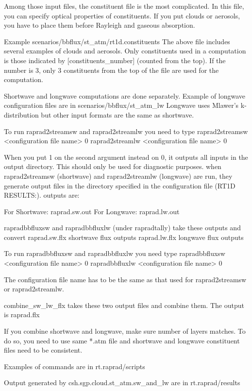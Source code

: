 Among those input files, the constituent file is the most complicated.
In this file, you can specify optical properties of constituents.
If you put clouds or aerosols, you have to place them before Rayleigh and gaseous absorption.

Example
scenarios/bbflux/st_atm/rt1d.constituents
The above file includes several examples of clouds and aerosols. Only constituents used in a computation is those
indicated by [constituents_number] (counted from the top). If the number is 3, only 3 constituents from the top
of the file are used for the computation.

Shortwave and longwave computations are done separately.
Example of longwave configuration files are in scenarios/bbflux/st_atm_lw
Longwave uses Mlawer's k-distribution but other input formats are the same as shortwave.

To run raprad2streamsw and raprad2streamlw you need to type
raprad2streamsw <configuration file name> 0
raprad2streamlw <configuration file name> 0

When you put 1 on the second argument instead on 0, it outputs all inputs in the output directory. This should only be used for diagnostic purposes.
when raprad2streamsw (shortwave) and raprad2streamlw (longwave) are run, they generate output files in the
directory specified in the configuration file (RT1D RESULTS:).
outputs are:

For Shortwave:	raprad.sw.out 
For Longwave:	raprad.lw.out

rapradbbfluxsw and rapradbbfluxlw (under rapradtally) take these outputs and convert
raprad.sw.flx   shortwave flux outputs
raprad.lw.flx   longwave flux outputs

To run rapradbbfluxsw and rapradbbfluxlw you need type
rapradbbfluxsw <configuration file name> 0
rapradbbfluxlw <configuration file name> 0

The configuration file name has to be the same as that used for raprad2streamsw or raprad2streamlw.

combine_sw_lw_flx takes these two output files and combine them. The output is
raprad.flx

If you combine shortwave and longwave, make sure number of layers matches.
To do so, you need to use same *.atm file and shortwave and longwave constituent files need to be consistent.

Examples of commands are in
rt.raprad/scripts

Output generated by csh.sgp.cloud.st_atm.sw_and_lw are in 
rt.raprad/results

 
